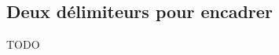 \documentclass[12pt, a4paper]{article}
\begin{document}


\subsection{Deux délimiteurs pour encadrer}

TODO
\end{document}
